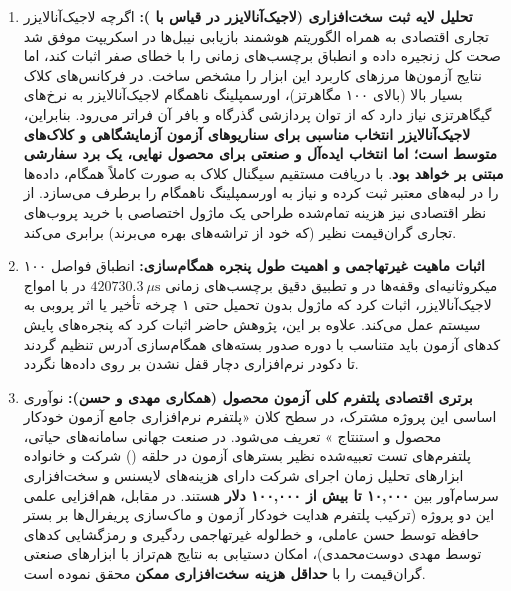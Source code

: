 \begin{enumerate}
    \item \textbf{تحلیل لایه ثبت سخت‌افزاری (لاجیک‌آنالایزر در قیاس با ):}
    اگرچه لاجیک‌آنالایزر تجاری اقتصادی به همراه الگوریتم هوشمند بازیابی نیبل‌ها در اسکریپت  موفق شد صحت کل زنجیره داده و انطباق برچسب‌های زمانی را با خطای صفر اثبات کند، اما نتایج آزمون‌ها مرزهای کاربرد این ابزار را مشخص ساخت. در فرکانس‌های کلاک بسیار بالا (بالای ۱۰۰ مگاهرتز)، اورسمپلینگ ناهمگام لاجیک‌آنالایزر به نرخ‌های گیگاهرتزی نیاز دارد که از توان پردازشی گذرگاه  و بافر  آن فراتر می‌رود. بنابراین، \textbf{لاجیک‌آنالایزر انتخاب مناسبی برای سناریوهای آزمون آزمایشگاهی و کلاک‌های متوسط است؛ اما انتخاب ایده‌آل و صنعتی برای محصول نهایی، یک برد سفارشی مبتنی بر  خواهد بود}.  با دریافت مستقیم سیگنال کلاک  به صورت کاملاً همگام، داده‌ها را در لبه‌های معتبر ثبت کرده و نیاز به اورسمپلینگ ناهمگام را برطرف می‌سازد. از نظر اقتصادی نیز هزینه تمام‌شده طراحی یک ماژول  اختصاصی با خرید پروب‌های تجاری گران‌قیمت نظیر  (که خود از تراشه‌های  بهره می‌برند) برابری می‌کند.

    \item \textbf{اثبات ماهیت غیرتهاجمی و اهمیت طول پنجره همگام‌سازی:}
    انطباق فواصل ۱۰۰ میکروثانیه‌ای وقفه‌ها در  و تطبیق دقیق برچسب‌های زمانی $420730.3\ \mu\mathrm{s}$ در  با امواج لاجیک‌آنالایزر، اثبات کرد که ماژول  بدون تحمیل حتی ۱ چرخه تأخیر یا اثر پروبی به سیستم عمل می‌کند. علاوه بر این، پژوهش حاضر اثبات کرد که پنجره‌های پایش کدهای آزمون باید متناسب با دوره صدور بسته‌های همگام‌سازی آدرس تنظیم گردند تا دکودر نرم‌افزاری دچار قفل نشدن بر روی داده‌ها نگردد.

    \item \textbf{برتری اقتصادی پلتفرم کلی آزمون محصول (همکاری مهدی و حسن):}
    نوآوری اساسی این پروژه مشترک، در سطح کلان «پلتفرم نرم‌افزاری جامع آزمون خودکار محصول و استنتاج » تعریف می‌شود. در صنعت جهانی سامانه‌های حیاتی، پلتفرم‌های تست تعبیه‌شده نظیر بسترهای آزمون در حلقه () شرکت  و خانواده ابزارهای تحلیل زمان اجرای شرکت  دارای هزینه‌های لایسنس و سخت‌افزاری سرسام‌آور بین \textbf{۱۰,۰۰۰ تا بیش از ۱۰۰,۰۰۰ دلار} هستند. در مقابل، هم‌افزایی علمی این دو پروژه (ترکیب پلتفرم هدایت خودکار آزمون و ماک‌سازی پریفرال‌ها بر بستر حافظه توسط حسن عاملی، و خط‌لوله غیرتهاجمی ردگیری و رمزگشایی کدهای  توسط مهدی دوست‌محمدی)، امکان دستیابی به نتایج هم‌تراز با ابزارهای صنعتی گران‌قیمت را با \textbf{حداقل هزینه سخت‌افزاری ممکن} محقق نموده است.
\end{enumerate}

